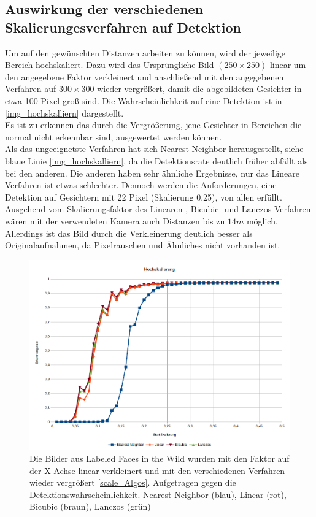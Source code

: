 \subsection{Auswirkung der verschiedenen Skalierungesverfahren auf Detektion}
\label{OpenFace_skal}
Um auf den gewünschten Distanzen arbeiten zu können, wird der jeweilige Bereich hochskaliert. Dazu wird das Ursprüngliche Bild $(250\times 250)$ linear um den angegebene Faktor verkleinert und anschließend mit den angegebenen Verfahren auf $300\times 300$ wieder vergrößert, damit die abgebildeten Gesichter in etwa 100 Pixel groß sind. Die Wahrscheinlichkeit auf eine Detektion ist in \autoref{img_hochskalliern} dargestellt.\\
Es ist zu erkennen das durch die Vergrößerung, jene Gesichter in Bereichen die normal nicht erkennbar sind, ausgewertet werden können.\\
Als das ungeeignetste Verfahren hat sich Nearest-Neighbor herausgestellt, siehe blaue Linie \autoref{img_hochskalliern}, da die Detektionsrate deutlich früher abfällt als bei den anderen. Die anderen haben sehr ähnliche Ergebnisse, nur das Lineare Verfahren ist etwas schlechter. Dennoch werden die Anforderungen, eine Detektion auf Gesichtern mit 22 Pixel (Skalierung 0.25), von allen erfüllt.\\
Ausgehend vom Skalierungsfaktor des Linearen-, Bicubic- und Lanczos-Verfahren wären mit der verwendeten Kamera auch Distanzen bis zu $14m$ möglich. Allerdings ist das Bild durch die Verkleinerung  deutlich besser als Originalaufnahmen, da Pixelrauschen und Ähnliches nicht vorhanden ist.
\begin{figure}
	\centering
	\includegraphics[width=0.5\linewidth]{img/Hochskalliern}
	\caption{Die Bilder aus Labeled Faces in the Wild \cite{database_Face} wurden mit den Faktor auf der X-Achse linear verkleinert und mit den verschiedenen Verfahren wieder vergrößert \autoref{scale_Algos}. Aufgetragen gegen die Detektionswahrscheinlichkeit.
		Nearest-Neighbor (blau), Linear (rot), Bicubic (braun), Lanczos (grün)}
	\label{img_hochskalliern}
\end{figure}
